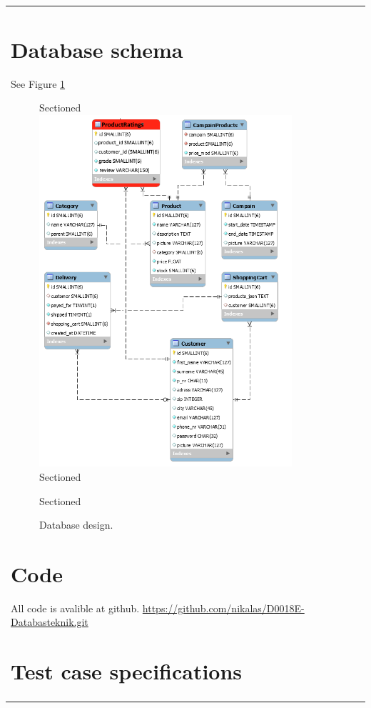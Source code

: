 \documentclass[paper=a4, fontsize=11pt]{report} %
\begin{document}
\begin{itemize}
\begin{tabular}{|l|l|l|l|l|}
				\section*{Database schema}
				\addcontentsline{toc}{section}{Database schema}
				See Figure \ref{fig:6}
				\begin{figure}
				Sectioned\includegraphics[scale=0.7]{artifacts/db_implemented_1_3.png}
				Sectioned\caption{Database design.}
				Sectioned\label{fig:6}
				\end{figure}

				\section*{Code}
				\addcontentsline{toc}{section}{Code}
				All code is avalible at github.
				\url{https://github.com/nikalas/D0018E-Databasteknik.git}

				\section*{Test case specifications}
				\addcontentsline{toc}{section}{Test case specifications}


\end{tabular}
\end{itemize}
\end{document}
